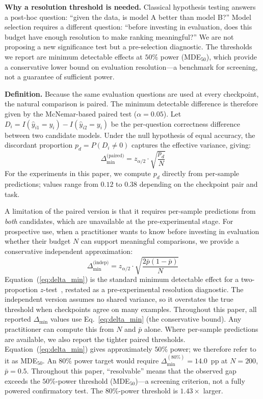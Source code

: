 \documentclass[pdflatex,sn-mathphys-ay,iicol]{sn-jnl}
\theoremstyle{thmstylethree}
\begin{document}
\noindent\textbf{Why a resolution threshold is needed.} Classical hypothesis testing answers a post-hoc question: ``given the data, is model A better than model B?'' Model selection requires a different question: ``before investing in evaluation, does this budget have enough resolution to make ranking meaningful?'' We are not proposing a new significance test but a pre-selection diagnostic. The thresholds we report are minimum detectable effects at $50\%$ power (MDE$_{50}$), which provide a conservative lower bound on evaluation resolution---a benchmark for screening, not a guarantee of sufficient power.

\noindent\textbf{Definition.} Because the same evaluation questions are used at every checkpoint, the natural comparison is paired. The minimum detectable difference is therefore given by the McNemar-based paired test ($\alpha=0.05$). Let $D_i = I(\hat y_{i1}=y_i) - I(\hat y_{i2}=y_i)$ be the per-question correctness difference between two candidate models. Under the null hypothesis of equal accuracy, the discordant proportion $p_d = P(D_i \neq 0)$ captures the effective variance, giving:
\begin{equation}
\Delta_{\min}^{\text{(paired)}} = z_{\alpha/2} \cdot \sqrt{\frac{p_d}{N}}
\label{eq:delta_min_paired}
\end{equation}
For the experiments in this paper, we compute $p_d$ directly from per-sample predictions; values range from $0.12$ to $0.38$ depending on the checkpoint pair and task.

A limitation of the paired version is that it requires per-sample predictions from \emph{both} candidates, which are unavailable at the pre-experimental stage. For prospective use, when a practitioner wants to know before investing in evaluation whether their budget $N$ can support meaningful comparisons, we provide a conservative independent approximation:
\begin{equation}
\Delta_{\min}^{\text{(indep)}} = z_{\alpha/2} \cdot \sqrt{ \frac{2 \bar{p} (1 - \bar{p})}{N} }
\label{eq:delta_min}
\end{equation}
Equation~(\ref{eq:delta_min}) is the standard minimum detectable effect for a two-proportion $z$-test~\citep{cohen1988statistical}, restated as a pre-experimental resolution diagnostic. The independent version assumes no shared variance, so it overstates the true threshold when checkpoints agree on many examples. Throughout this paper, all reported $\Delta_{\min}$ values use Eq.~\eqref{eq:delta_min} (the conservative bound). Any practitioner can compute this from $N$ and $\bar{p}$ alone. Where per-sample predictions are available, we also report the tighter paired thresholds. Equation~(\ref{eq:delta_min}) gives approximately $50\%$ power; we therefore refer to it as MDE$_{50}$. An $80\%$ power target would require $\Delta_{\min}^{(80\%)}=14.0$~pp at $N=200$, $\bar{p}=0.5$. Throughout this paper, ``resolvable'' means that the observed gap exceeds the $50\%$-power threshold (MDE$_{50}$)---a screening criterion, not a fully powered confirmatory test. The $80\%$-power threshold is $1.43\times$ larger.
\end{document}
